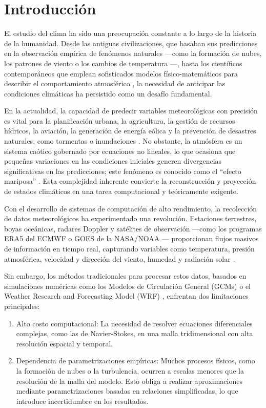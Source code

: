 \chapter*{Introducción} %

El estudio del clima ha sido una preocupación constante a lo largo de la historia de la humanidad. Desde las antiguas civilizaciones, que basaban sus predicciones en la observación empírica de fenómenos naturales —como la formación de nubes, los patrones de viento o los cambios de temperatura \citep{ossendrijver2021babylonian}—, hasta los científicos contemporáneos que emplean sofisticados modelos físico-matemáticos para describir el comportamiento atmosférico \citep{lorenz1963deterministic}, la necesidad de anticipar las condiciones climáticas ha persistido como un desafío fundamental.

En la actualidad, la capacidad de predecir variables meteorológicas con precisión es vital para la planificación urbana, la agricultura, la gestión de recursos hídricos, la aviación, la generación de energía eólica y la prevención de desastres naturales, como tormentas o inundaciones \citep{wmo2023state}. No obstante, la atmósfera es un sistema caótico gobernado por ecuaciones no lineales, lo que ocasiona que pequeñas variaciones en las condiciones iniciales generen divergencias significativas en las predicciones; este fenómeno es conocido como el “efecto mariposa” \citep{lorenz1972predictability}. Esta complejidad inherente convierte la reconstrucción y proyección de estados climáticos en una tarea computacional y teóricamente exigente.

Con el desarrollo de sistemas de computación de alto rendimiento, la recolección de datos meteorológicos ha experimentado una revolución. Estaciones terrestres, boyas oceánicas, radares Doppler y satélites de observación —como los programas ERA5 del ECMWF o GOES de la NASA/NOAA \citep{aragao2022cyclonic}— proporcionan flujos masivos de información en tiempo real, capturando variables como temperatura, presión atmosférica, velocidad y dirección del viento, humedad y radiación solar \citep{hasler1989automatic}.

Sin embargo, los métodos tradicionales para procesar estos datos, basados en simulaciones numéricas como los Modelos de Circulación General (GCMs) \citep{guilyardi2009coupled} o el Weather Research and Forecasting Model (WRF) \citep{skamarock2001wrf}, enfrentan dos limitaciones principales:
\begin{enumerate}
    \item Alto costo computacional: La necesidad de resolver ecuaciones diferenciales complejas, como las de Navier-Stokes, en una malla tridimensional con alta resolución espacial y temporal.

    \item Dependencia de parametrizaciones empíricas: Muchos procesos físicos, como la formación de nubes o la turbulencia, ocurren a escalas menores que la resolución de la malla del modelo. Esto obliga a realizar aproximaciones mediante parametrizaciones basadas en relaciones simplificadas, lo que introduce incertidumbre en los resultados.
\end{enumerate}

